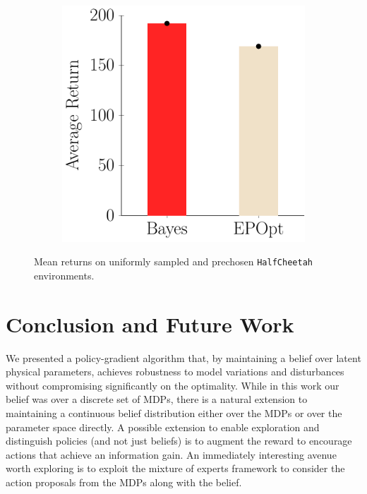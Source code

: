 \documentclass{article}
\begin{document}
\begin{figure}[t!]
\begin{centering}
\begin{subfigure}[b]{0.3\columnwidth}
\label{fig:oneFromK}
\end{subfigure}
~
\begin{subfigure}[b]{0.23\columnwidth}
\includegraphics[width=\linewidth]{figs/cheetah_average.pdf}
\label{fig:all20}
\end{subfigure}
\end{centering}
\caption{Mean returns on uniformly sampled and prechosen \texttt{HalfCheetah} environments.}
\label{fig:Bars}
\end{figure}



\section{Conclusion and Future Work}
We presented a policy-gradient algorithm that, by maintaining a belief over latent physical parameters, achieves robustness to model variations and disturbances without compromising significantly on the optimality.
While in this work our belief was over a discrete set of MDPs, there is a natural extension to maintaining a continuous belief distribution either over the MDPs or over the parameter space directly.
A possible extension to enable exploration and distinguish policies (and not just beliefs) is to augment the reward to encourage actions that achieve an information gain.
An immediately interesting avenue worth exploring is to exploit the mixture of experts framework to consider the action proposals from the MDPs along with the belief.
\end{document}
